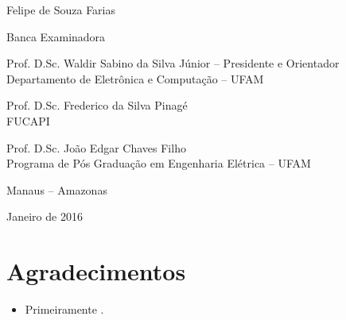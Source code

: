 





\begin{center}
{\large Felipe de Souza Farias}

\vspace*{3cm}

\tittese

\vspace*{1cm}


\vspace*{1cm}

Banca Examinadora
\vspace{2em}

Prof. D.Sc. Waldir Sabino da Silva Júnior -- Presidente e Orientador\\
Departamento de Eletrônica e Computação -- UFAM
\vspace{2em}

Prof. D.Sc. Frederico da Silva Pinagé \\
FUCAPI
\vspace{2em}

Prof. D.Sc. João Edgar Chaves Filho \\
Programa de Pós Graduação em Engenharia Elétrica -- UFAM
\vspace{2em}


Manaus -- Amazonas

Janeiro de 2016

\end{center}

\thispagestyle{empty}


  \chapter*{Agradecimentos}
\begin{itemize}
  \item Primeiramente .


\end{itemize}


